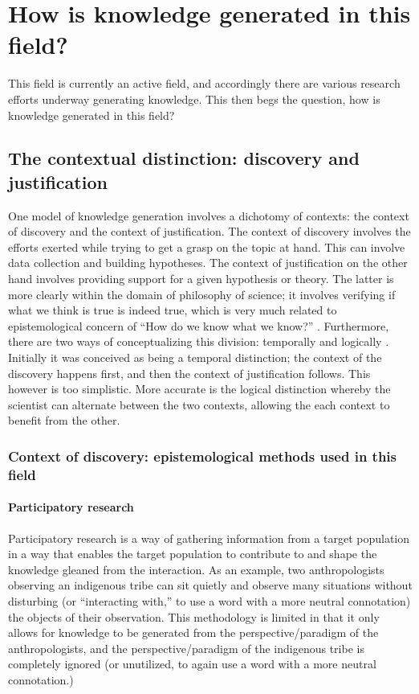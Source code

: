 \documentclass[a4paper]{article}
\begin{document}
\section{How is knowledge generated in this field?}


This field is currently an active field, and accordingly there are various
research efforts underway generating knowledge. This then begs the question,
how is knowledge generated in this field?  

\subsection{The contextual distinction: discovery and justification}

One model of knowledge generation involves a dichotomy of contexts: the
context of discovery and the context of justification. The context of
discovery involves the efforts exerted while trying to get a grasp on the
topic at hand. This can involve data collection and building hypotheses. The
context of justification on the other hand involves providing support for a
given hypothesis or theory. The latter is more clearly within the domain of
philosophy of science; it involves verifying if what we think is true is
indeed true, which is very much related to epistemological concern of ``How do
we know what we know?''  \cite{schickore2014scientific}. Furthermore, there
are two ways of conceptualizing this division: temporally and logically
\cite{schickore2006introduction}.  Initially it was conceived as being a
temporal distinction; the context of the discovery happens first, and then the
context of justification follows. This however is too simplistic.  More
accurate is the logical distinction whereby the scientist can alternate
between the two contexts, allowing the each context to benefit from the other.


\subsubsection{Context of discovery: epistemological methods used in this field}

\paragraph{Participatory research}

Participatory research is a way of gathering information from a target
population in a way that enables the target population to contribute to and
shape the knowledge gleaned from the interaction. As an example, two
anthropologists observing an indigenous tribe can sit quietly and observe many
situations without disturbing (or ``interacting with,'' to use a word with a
more neutral connotation) the objects of their observation. This methodology
is limited in that it only allows for knowledge to be generated from the
perspective/paradigm of the anthropologists, and the perspective/paradigm of
the indigenous tribe is completely ignored (or unutilized, to again use a word
with a more neutral connotation.)
\end{document}
